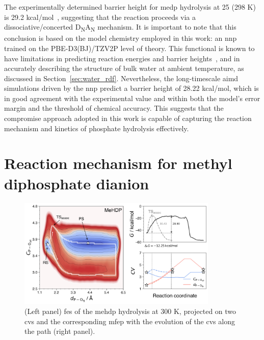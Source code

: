 The experimentally determined barrier height for \ac{medp} hydrolysis at 25 (298 K) is 29.2 kcal/mol~\citep{wolfendenDegreesDifficultyWaterConsuming2006}, suggesting that the reaction proceeds via a dissociative/concerted D\textsubscript{N}A\textsubscript{N} mechanism. It is important to note that this conclusion is based on the model chemistry employed in this work: an \ac{nnp} trained on the PBE-D3(BJ)/TZV2P level of theory. This functional is known to have limitations in predicting reaction energies and barrier heights~\citep{burschBestPracticeDFTProtocols2022}, and in accurately describing the structure of bulk water at ambient temperature, as discussed in Section~\ref{sec:water_rdf}. Nevertheless, the long-timescale \ac{aimd} simulations driven by the \ac{nnp} predict a barrier height of 28.22 kcal/mol, which is in good agreement with the experimental value and within both the model's error margin and the threshold of chemical accuracy. This suggests that the compromise approach adopted in this work is capable of capturing the reaction mechanism and kinetics of phosphate hydrolysis effectively.



\section{Reaction mechanism for methyl diphosphate dianion}

\begin{figure}[b!]
\centering
\includegraphics[width=0.85\textwidth]{Figures/4_Results/results_MeHDP_300K_fes_mfep.png}
\caption{(Left panel) \ac{fes} of the \ac{mehdp} hydrolysis at 300 K, projected on two \acp{cv} and the corresponding \ac{mfep} with the evolution of the \acp{cv} along the path (right panel).}
\label{fig:mehdp_300k_fes_mfep}
\end{figure}

